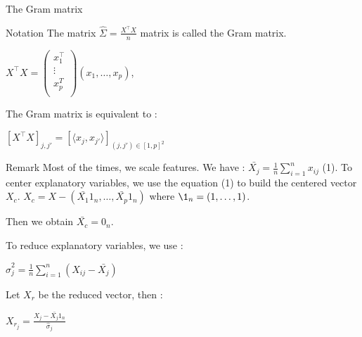\documentclass[unknownkeysallowed]{beamer}
\begin{document}
\begin{frame}{The Gram matrix}


\begin{block}{Notation}
The matrix $\hat\Sigma=\frac{X^{\top}X}{n}$ matrix is called the Gram matrix.
\begin{center}
   $X^{\top}X=\begin{pmatrix}
   x_{1}^{\top}  \\
   \vdots   \\
   x_{p}^T  \\
\end{pmatrix}(x_{1},\dots, x_{p}) $,
\end{center}
\end{block}

The Gram matrix is equivalent to :

\begin{center}
$[X^{\top}X]_{j,j'}=[\langle x_{j},x_{j'}\rangle]_{(j,j')\in[1,p]^2}$ 
\end{center}


\end{frame}



\begin{block}{Remark}
Most of the times, we scale features.
\newline
We have : $\bar{X_{j}}=\frac{1}{n} \sum\limits_{i=1}^{n} x_{ij}$ (1).
\newline
 To center explanatory variables, we use the equation (1) to build the centered vector $X_{c}$.
\newline
$X_{c} = X - (\bar{X_{1}}1_n,\dots,\bar{X_{p}}1_n)$ where $\1_n=(1,\dots,1)$.

Then we obtain $\bar{X_{c}}=0_n$.

To reduce explanatory variables, we use :
\newline
\begin{center}
$\hat\sigma_{j}^2=\frac{1}{n} \sum\limits_{i=1}^{n} (X_{ij}-\bar{X_{j}})$
\end{center}
Let $X_r$ be the reduced vector, then :
\newline
\begin{center}
$X_{r_{j}}=\frac{X_{j}-\bar{X_{j}}1_n}{\hat\sigma_{j}}$    
\end{center}

\end{block}
\end{document}
